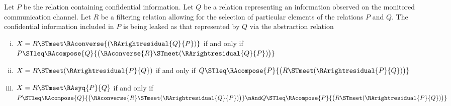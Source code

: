 \begin{corollary}
\label{cor:compute}
	Let $P$ be the relation containing confidential information. Let $Q$ be a relation representing an information observed on the monitored communication channel. Let $R$ be a filtering relation allowing for the selection of particular elements of the relations $P$ and $Q$. The confidential information included in $P$ is being leaked as that represented by $Q$ via the abstraction relation 
	\begin{enumerate}[(i)]
		\item $X = R \STmeet \RAconverse{(\RArightresidual{Q}{P})}$ if and only if $P \STleq \RAcompose{Q}{\big(\RAconverse{R} \STmeet (\RArightresidual{Q}{P})\big)}$
		\item $X = R \STmeet (\RArightresidual{P}{Q})$ if and only if $Q \STleq \RAcompose{P}{\big(R \STmeet (\RArightresidual{P}{Q})\big)}$
		\item $X = R \STmeet \RAsyq{P}{Q}$ if and only if $P \STleq \RAcompose{Q}{\big(\RAconverse{R} \STmeet (\RArightresidual{Q}{P})\big)} \nAnd Q \STleq \RAcompose{P}{\big(R \STmeet (\RArightresidual{P}{Q})\big)}$
	\end{enumerate}
	

\end{corollary}
